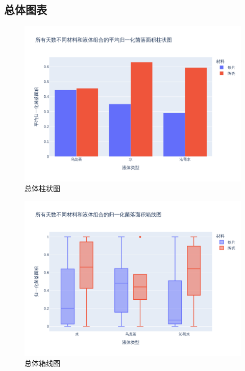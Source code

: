 \documentclass[12pt,a4paper]{ctexart}
\begin{document}
\subsection{总体图表}
\begin{figure}[H]  %
    \centering  %
    \includegraphics[width=\textwidth]{./plot/General/bar_normalized_overall.png}  %
    \caption{总体柱状图}  %
    \label{fig:GeneralBar}  %
\end{figure}

\begin{figure}[H]  %
    \centering  %
    \includegraphics[width=\textwidth]{./plot/General/boxplot_normalized_overall.png}  %
    \caption{总体箱线图}  %
    \label{fig:GeneralBox}  %
\end{figure}
\end{document}
